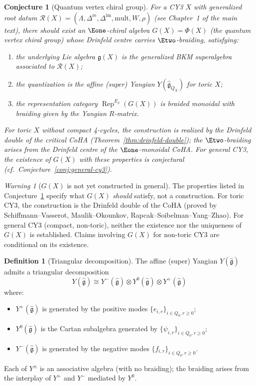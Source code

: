 \documentclass[11pt]{article}
\newtheorem{conjecture}[theorem]{Conjecture}
\theoremstyle{definition}
\newtheorem{definition}[theorem]{Definition}
\theoremstyle{remark}
\newtheorem{warning}[theorem]{Warning}
\newcommand{\Rep}{\operatorname{Rep}}
\newcommand{\cR}{\mathcal{R}}
\newcommand{\frakg}{\mathfrak{g}}
\begin{document}
\begin{conjecture}[Quantum vertex chiral group]
\label{conj:qvcg}
For a CY3 $X$ with generalized root datum $\cR(X) = (\Lambda, \Delta^{\mathrm{re}},
\Delta^{\mathrm{im}}, \text{mult}, W, \rho)$ (see Chapter~1 of the main text),
there should exist an $\Eone$-chiral algebra $G(X) = \Phi(X)$ (the \emph{quantum vertex chiral group}) whose Drinfeld centre carries $\Etwo$-braiding, satisfying:
\begin{enumerate}[label=(\roman*)]
 \item the underlying Lie algebra $\frakg(X)$ is the generalized BKM superalgebra
 associated to $\cR(X)$;
 \item the quantization is the affine (super) Yangian $Y(\widehat{\frakg}_{Q_X})$
 for toric $X$;
 \item the representation category $\Rep^{E_2}(G(X))$ is braided monoidal with
 braiding given by the Yangian $R$-matrix.
\end{enumerate}
For toric $X$ without compact 4-cycles, the construction is realized by the Drinfeld double of the critical CoHA (Theorem~\ref{thm:drinfeld-double}); the $\Etwo$-braiding arises from the Drinfeld centre of the $\Eone$-monoidal CoHA. For general CY3, the existence of $G(X)$ with these properties is conjectural (cf.\ Conjecture~\ref{conj:general-cy3}).
\end{conjecture}

\begin{warning}[$G(X)$ is not yet constructed in general]
\label{warn:gx-not-constructed}
The properties listed in Conjecture~\ref{conj:qvcg} specify what $G(X)$ \emph{should} satisfy, not a construction. For toric CY3, the construction is the Drinfeld double of the CoHA (proved by Schiffmann--Vasserot, Maulik--Okounkov, Rapcak--Soibelman--Yang--Zhao). For general CY3 (compact, non-toric), neither the existence nor the uniqueness of $G(X)$ is established. Claims involving $G(X)$ for non-toric CY3 are conditional on its existence.
\end{warning}

\begin{definition}[Triangular decomposition]
\label{def:triangular-decomp}
The affine (super) Yangian $Y(\widehat{\frakg})$ admits a triangular decomposition
\[
 Y(\widehat{\frakg}) \cong Y^-(\widehat{\frakg}) \otimes Y^0(\widehat{\frakg})
 \otimes Y^+(\widehat{\frakg})
\]
where:
\begin{itemize}
 \item $Y^+(\widehat{\frakg})$ is generated by the positive modes $\{e_{i,r}\}_{i \in Q_0, r \geq 0}$;
 \item $Y^0(\widehat{\frakg})$ is the Cartan subalgebra generated by $\{\psi_{i,r}\}_{i \in Q_0, r \geq 0}$;
 \item $Y^-(\widehat{\frakg})$ is generated by the negative modes $\{f_{i,r}\}_{i \in Q_0, r \geq 0}$.
\end{itemize}
Each of $Y^{\pm}$ is an associative algebra (with no braiding);
the braiding arises from the interplay of $Y^+$ and $Y^-$ mediated by $Y^0$.
\end{definition}
\end{document}

